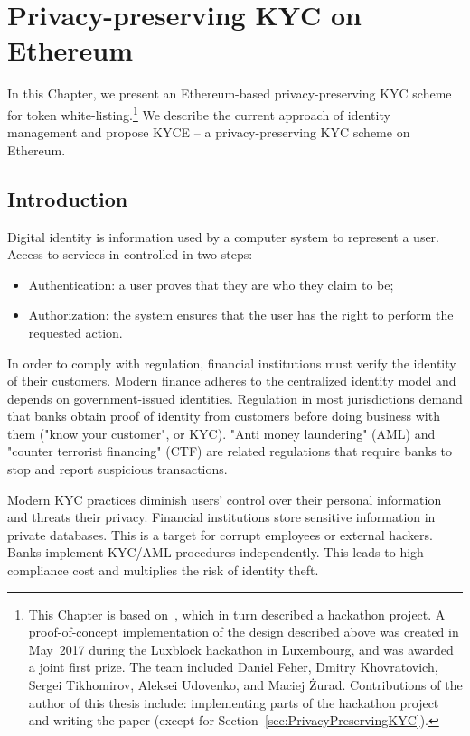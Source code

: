 \chapter{Privacy-preserving KYC on Ethereum}

\label{Chapter12KYC}

In this Chapter, we present an Ethereum-based privacy-preserving KYC scheme for token white-listing.\footnote{This Chapter is based on~\cite{Biryukov2018}, which in turn described a hackathon project. A proof-of-concept implementation of the design described above was created in May~2017 during the Luxblock hackathon in Luxembourg, and was awarded a joint first prize. The team included Daniel Feher, Dmitry Khovratovich, Sergei Tikhomirov, Aleksei Udovenko, and Maciej \.{Z}urad. Contributions of the author of this thesis include: implementing parts of the hackathon project and writing the paper (except for Section~\ref{sec:PrivacyPreservingKYC}).}
We describe the current approach of identity management and propose KYCE -- a privacy-preserving KYC scheme on Ethereum.



\section{Introduction}

Digital identity is information used by a computer system to represent a user.
Access to services in controlled in two steps:

\begin{itemize}
	\item Authentication: a user proves that they are who they claim to be;
	\item Authorization: the system ensures that the user has the right to perform the requested action.
\end{itemize}

In order to comply with regulation, financial institutions must verify the identity of their customers.
Modern finance adheres to the centralized identity model and depends on government-issued identities.
Regulation in most jurisdictions demand that banks obtain proof of identity from customers before doing business with them ("know your customer", or KYC).
"Anti money laundering" (AML) and "counter terrorist financing" (CTF) are related regulations that require banks to stop and report suspicious transactions.

Modern KYC practices diminish users' control over their personal information and threats their privacy.
Financial institutions store sensitive information in private databases.
This is a target for corrupt employees or external hackers.
Banks implement KYC/AML procedures independently.
This leads to high compliance cost and multiplies the risk of identity theft.

